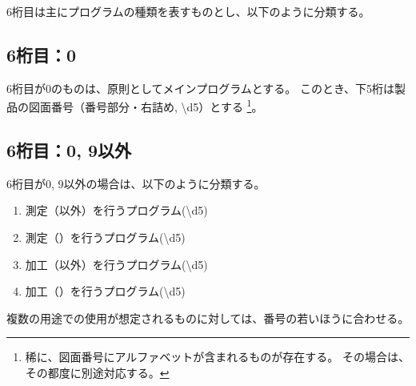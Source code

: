 \clearpage
6桁目は主にプログラムの種類を表すものとし、以下のように分類する。

\subsection{6桁目：0}
6桁目が0のものは、原則としてメインプログラムとする。
このとき、下5桁は製品の図面番号（番号部分・右詰め, {\ttfamily\textbackslash d{5}}）とする
\footnote{稀に、図面番号にアルファベットが含まれるものが存在する。
その場合は、その都度に別途対応する。}。

\subsection{6桁目：0, 9以外}
6桁目が0, 9以外の場合は、以下のように分類する。
\begin{enumerate}[label=\arabic*., ref=\arabic*, start=1]
\item\label{item:6Mmain} 測定（\Dimple 以外）を行うプログラム({\textbackslash d{5}})
\item\label{item:6MD} 測定（\Dimple）を行うプログラム({\textbackslash d{5}})
\setcounter{enumi}{3}
\item\label{item:6Kmain} 加工（\Dimple 以外）を行うプログラム({\textbackslash d{5}})
\item\label{item:6KD} 加工（\Dimple）を行うプログラム({\textbackslash d{5}})
\end{enumerate}
複数の用途での使用が想定されるものに対しては、番号の若いほうに合わせる。


